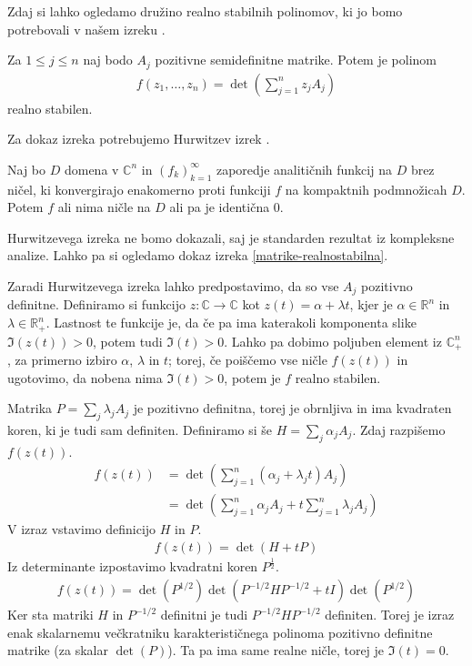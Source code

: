 Zdaj si lahko ogledamo družino realno stabilnih polinomov, ki jo bomo potrebovali v našem izreku \cite{JuliusPetter}.
\begin{izrek}\label{matrike-realnostabilna}
    Za \(1\leq j \leq n\) naj bodo \(A_j\) pozitivne semidefinitne matrike. Potem je polinom
    \begin{align*}
        f(z_1, \ldots, z_n) = \det\left(\sum_{j=1}^n z_j A_j\right)
    \end{align*}
    realno stabilen.
\end{izrek}
Za dokaz izreka potrebujemo Hurwitzev izrek \cite{freitag1}.
\begin{izrek}\label{hurwitz}
    Naj bo \(D\) domena v \(\mathbb C^n\) in \((f_k)_{k=1}^\infty\) zaporedje analitičnih funkcij na \(D\) brez ničel, ki konvergirajo enakomerno proti funkciji \(f\) na kompaktnih podmnožicah \(D\). Potem \(f\) ali nima ničle na \(D\) ali pa je identična \(0\).
\end{izrek}
Hurwitzevega izreka ne bomo dokazali, saj je standarden rezultat iz kompleksne analize. Lahko pa si ogledamo dokaz izreka \ref{matrike-realnostabilna}.
\begin{dokaz}
    Zaradi Hurwitzevega izreka lahko predpostavimo, da so vse \(A_j\) pozitivno definitne. Definiramo si funkcijo \(z: \mathbb C\to \mathbb C\) kot \(z(t) = \alpha + \lambda t\), kjer je \(\alpha\in \mathbb R^n\) in \(\lambda \in \mathbb R_+^n\). Lastnost te funkcije je, da če pa ima katerakoli komponenta slike \(\Im(z(t))>0\), potem tudi \(\Im(t)>0\). Lahko pa dobimo poljuben element iz \(\mathbb C_+^n\), za primerno izbiro \(\alpha\), \(\lambda\) in \(t\); torej, če poiščemo vse ničle \(f(z(t))\) in ugotovimo, da nobena nima \(\Im(t)>0\), potem je \(f\) realno stabilen.

    Matrika \(P = \sum_j \lambda_j A_j\) je pozitivno definitna, torej je obrnljiva in ima kvadraten koren, ki je tudi sam definiten. Definiramo si še \(H = \sum_j \alpha_j A_j\). Zdaj razpišemo \(f(z(t))\).
    \begin{align*}
        f(z(t)) & = \det\left(\sum_{j=1}^n (\alpha_j + \lambda_j t) A_j\right) \\
                & = \det\left(\sum_{j=1}^n \alpha_j A_j + t\sum_{j=1}^n \lambda_j A_j\right)
    \end{align*}
    V izraz vstavimo definicijo \(H\) in \(P\).
    \begin{align*}
        f(z(t))  = \det\left(H+ tP\right)
    \end{align*}
    Iz determinante izpostavimo kvadratni koren \(P^{\frac12}\).
    \begin{align*}
        f(z(t)) = \det\left(P^{1/2}\right)\det\left(P^{-1/2}HP^{-1/2} + tI\right) \det\left(P^{1/2}\right)
    \end{align*}
    Ker sta matriki \(H\) in \(P^{-1/2}\) definitni je tudi \(P^{-1/2}HP^{-1/2}\) definiten. Torej je izraz enak skalarnemu večkratniku karakterističnega polinoma pozitivno definitne matrike (za skalar \(\det(P)\)). Ta pa ima same realne ničle, torej je \(\Im(t)=0\).
\end{dokaz}

